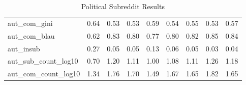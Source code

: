 \begin{table}
\begin{tabular}{lrrrrrrrr}
aut\_com\_gini        &        0.64 &         0.53 &          0.53 &       0.59 &          0.54 &       0.55 &                 0.53 &                 0.57 \\
aut\_com\_blau        &        0.62 &         0.83 &          0.80 &       0.77 &          0.80 &       0.82 &                 0.85 &                 0.84 \\
aut\_insub           &        0.27 &         0.05 &          0.05 &       0.13 &          0.06 &       0.05 &                 0.03 &                 0.04 \\
aut\_sub\_count\_log10 &        0.70 &         1.20 &          1.11 &       1.00 &          1.08 &       1.11 &                 1.26 &                 1.18 \\
aut\_com\_count\_log10 &        1.34 &         1.76 &          1.70 &       1.49 &          1.67 &       1.65 &                 1.82 &                 1.65 \\
\bottomrule
\end{tabular}
\caption{Political Subreddit Results}
\label{table/pol}
\end{table}